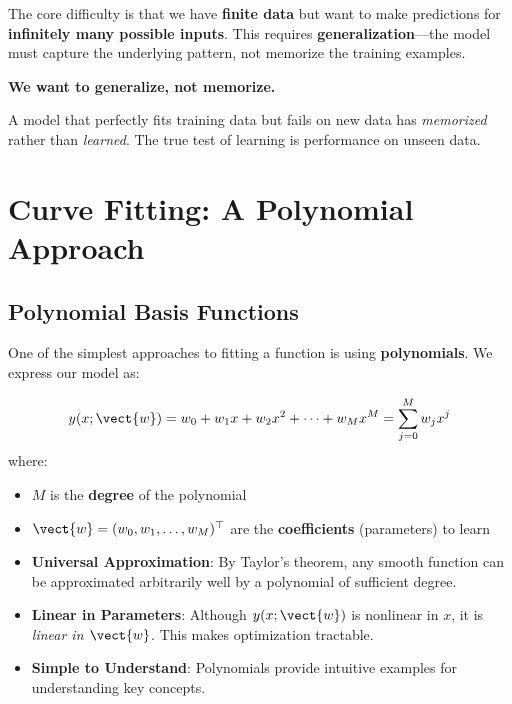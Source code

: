The core difficulty is that we have \textbf{finite data} but want to make predictions for \textbf{infinitely many possible inputs}. This requires \textbf{generalization}---the model must capture the underlying pattern, not memorize the training examples.

\begin{importantbox}
\textbf{We want to generalize, not memorize.}

A model that perfectly fits training data but fails on new data has \textit{memorized} rather than \textit{learned}. The true test of learning is performance on unseen data.
\end{importantbox}


\section{Curve Fitting: A Polynomial Approach}

\subsection{Polynomial Basis Functions}

One of the simplest approaches to fitting a function is using \textbf{polynomials}. We express our model as:

\begin{definitionbox}
\[
y(x; \vect{w}) = w_0 + w_1 x + w_2 x^2 + \cdots + w_M x^M = \sum_{j=0}^{M} w_j x^j
\]
where:
\begin{itemize}
    \item $M$ is the \textbf{degree} of the polynomial
    \item $\vect{w} = (w_0, w_1, \ldots, w_M)^\top$ are the \textbf{coefficients} (parameters) to learn
\end{itemize}
\end{definitionbox}

\begin{bluebox}
\begin{itemize}
    \item \textbf{Universal Approximation}: By Taylor's theorem, any smooth function can be approximated arbitrarily well by a polynomial of sufficient degree.
    \item \textbf{Linear in Parameters}: Although $y(x; \vect{w})$ is nonlinear in $x$, it is \textit{linear in $\vect{w}$}. This makes optimization tractable.
    \item \textbf{Simple to Understand}: Polynomials provide intuitive examples for understanding key concepts.
\end{itemize}
\end{bluebox}

